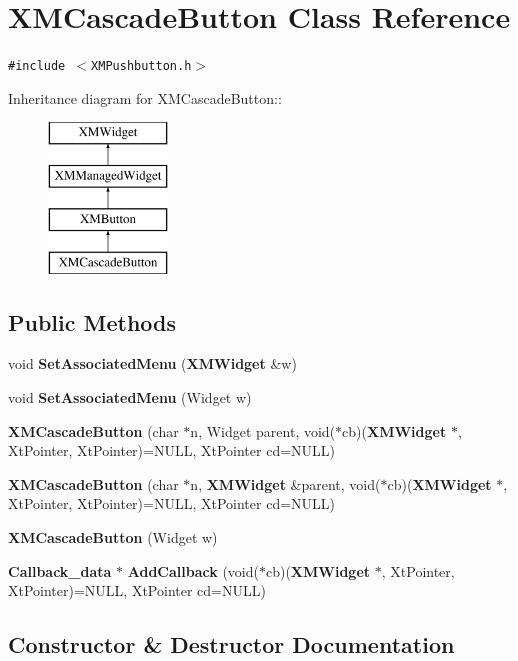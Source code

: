 \section{XMCascade\-Button  Class Reference}
\label{classXMCascadeButton}
{\tt \#include $<$XMPushbutton.h$>$}

Inheritance diagram for XMCascade\-Button::\begin{figure}[H]
\begin{center}
\leavevmode
\includegraphics[height=4cm]{classXMCascadeButton}
\end{center}
\end{figure}
\subsection*{Public Methods}
\begin{CompactItemize}
\item 
void {\bf Set\-Associated\-Menu} ({\bf XMWidget} \&w)
\item 
void {\bf Set\-Associated\-Menu} (Widget w)
\item 
{\bf XMCascade\-Button} (char $\ast$n, Widget parent, void($\ast$cb)({\bf XMWidget} $\ast$, Xt\-Pointer, Xt\-Pointer)=NULL, Xt\-Pointer cd=NULL)
\item 
{\bf XMCascade\-Button} (char $\ast$n, {\bf XMWidget} \&parent, void($\ast$cb)({\bf XMWidget} $\ast$, Xt\-Pointer, Xt\-Pointer)=NULL, Xt\-Pointer cd=NULL)
\item 
{\bf XMCascade\-Button} (Widget w)
\item 
{\bf Callback\_\-data} $\ast$ {\bf Add\-Callback} (void($\ast$cb)({\bf XMWidget} $\ast$, Xt\-Pointer, Xt\-Pointer)=NULL, Xt\-Pointer cd=NULL)
\end{CompactItemize}


\subsection{Constructor \& Destructor Documentation}
